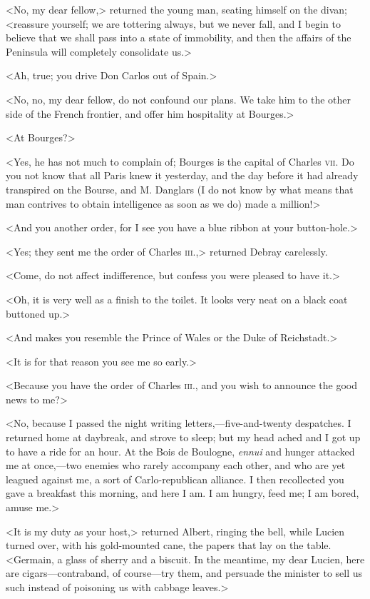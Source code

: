  <No, my dear fellow,> returned the young man, seating himself on the divan; <reassure yourself; we are tottering always, but we never fall, and I begin to believe that we shall pass into a state of immobility, and then the affairs of the Peninsula will completely consolidate us.> 

 <Ah, true; you drive Don Carlos out of Spain.> 

 <No, no, my dear fellow, do not confound our plans. We take him to the other side of the French frontier, and offer him hospitality at Bourges.> 

 <At Bourges?> 

 <Yes, he has not much to complain of; Bourges is the capital of Charles \textsc{vii.} Do you not know that all Paris knew it yesterday, and the day before it had already transpired on the Bourse, and M. Danglars (I do not know by what means that man contrives to obtain intelligence as soon as we do) made a million!> 

 <And you another order, for I see you have a blue ribbon at your button-hole.> 

 <Yes; they sent me the order of Charles \textsc{iii.},> returned Debray carelessly. 

 <Come, do not affect indifference, but confess you were pleased to have it.> 

 <Oh, it is very well as a finish to the toilet. It looks very neat on a black coat buttoned up.> 

 <And makes you resemble the Prince of Wales or the Duke of Reichstadt.> 

 <It is for that reason you see me so early.> 

 <Because you have the order of Charles \textsc{iii.}, and you wish to announce the good news to me?> 

 <No, because I passed the night writing letters,—five-and-twenty despatches. I returned home at daybreak, and strove to sleep; but my head ached and I got up to have a ride for an hour. At the Bois de Boulogne, \textit{ennui} and hunger attacked me at once,—two enemies who rarely accompany each other, and who are yet leagued against me, a sort of Carlo-republican alliance. I then recollected you gave a breakfast this morning, and here I am. I am hungry, feed me; I am bored, amuse me.> 

 <It is my duty as your host,> returned Albert, ringing the bell, while Lucien turned over, with his gold-mounted cane, the papers that lay on the table. <Germain, a glass of sherry and a biscuit. In the meantime, my dear Lucien, here are cigars—contraband, of course—try them, and persuade the minister to sell us such instead of poisoning us with cabbage leaves.> 

